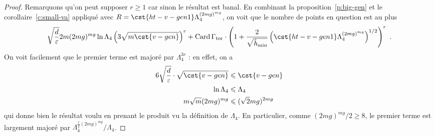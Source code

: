 \begin{proof}
  Remarquons qu'on peut supposer \( r \ge 1 \) car sinon le résultat est
  banal.  En combinant la proposition~\vref{p:big-gen} et le
  corollaire~\vref{c:small-va} appliqué avec \( R = \cst{ht-v-gen1}
    \Lambda_4^{(2mg)^{mg}} \), on voit que le nombre de
  points en question est au plus
  \begin{equation}
    \sqrt{\frac d \eps}
    2 m
    (2mg)^{mg}
    \ln \Lambda_4
    \left( 3 \sqrt{ m \cst{v-gen} } \right)^r
    +
    \card \Gamma_\torsion
    \cdot
    \left( 1 + \frac2{\sqrt{\hmin}}
      \left(
        \cst{ht-v-gen1} \Lambda_4^{(2mg)^{mg}}
      \right)^{1/2}
    \right)^r
    \pmm.
  \end{equation}
  On voit facilement que le premier terme est majoré par \( \Lambda_4^{3r} \)
  : en effet, on a
  \begin{align}
    6 \sqrt{\frac d \eps}
    \cdot \sqrt{ \cst{v-gen} }
    & \le
    \cst{v-gen}
    \\
    \ln \Lambda_4
    & \le
    \Lambda_4
    \\
    m \sqrt m
    (2mg)^{mg}
    & \le
    (\sqrt2 m g)^{2mg}
  \end{align}
  qui donne bien le résultat voulu en prenant le produit vu la définition de
  \( \Lambda_4 \). En particulier, comme \( (2mg)^{mg} /
    2 \ge 8 \), le premier terme est largement majoré par \( \Lambda_4^{ \frac
      r2 (2mg)^{mg} } / \Lambda_4 \).


\end{proof}
